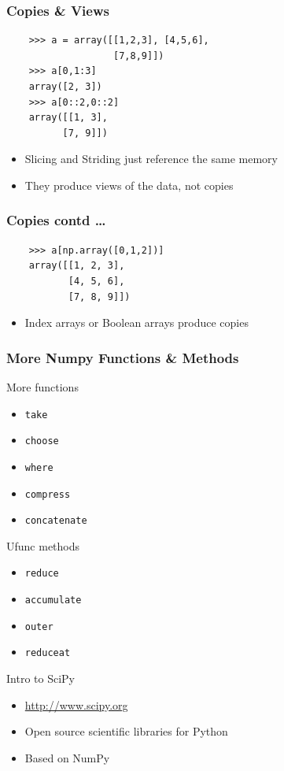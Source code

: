 \documentclass[14pt,compress]{beamer}
\newcounter{time}
\newcommand{\inctime}[1]{\addtocounter{time}{#1}{\tiny \thetime\ m}}
\newcommand{\typ}[1]{\lstinline{#1}}
\begin{document}
\begin{frame}[fragile]
  \frametitle{Copies \& Views}
  \begin{lstlisting}
    >>> a = array([[1,2,3], [4,5,6],     
                   [7,8,9]])
    >>> a[0,1:3]
    array([2, 3])
    >>> a[0::2,0::2]
    array([[1, 3],
          [7, 9]])
  \end{lstlisting}
  \begin{itemize}
  \item Slicing and Striding just reference the same memory
  \item They produce views of the data, not copies
  \end{itemize}
\end{frame}

\begin{frame}[fragile]
  \frametitle{Copies contd \ldots}
  \begin{lstlisting}
    >>> a[np.array([0,1,2])]
    array([[1, 2, 3],
           [4, 5, 6],
           [7, 8, 9]])
  \end{lstlisting}
  \begin{itemize}
  \item Index arrays or Boolean arrays produce copies
  \end{itemize}
\inctime{15}
\end{frame}

\begin{frame}
  \frametitle{More Numpy Functions \& Methods}
  More functions
  \begin{itemize}
    \item \typ{take}
    \item \typ{choose}
    \item \typ{where}
    \item \typ{compress}
    \item \typ{concatenate}
  \end{itemize}
  Ufunc methods 
  \begin{itemize}
    \item \typ{reduce}
    \item \typ{accumulate}
    \item \typ{outer}
    \item \typ{reduceat}
  \end{itemize}
\inctime{5}
\end{frame}

\begin{frame}
    {Intro to SciPy}
  \begin{itemize}
  \item \url{http://www.scipy.org}
  \item Open source scientific libraries for Python
  \item Based on NumPy
    \end{itemize}
\end{frame}
\end{document}

